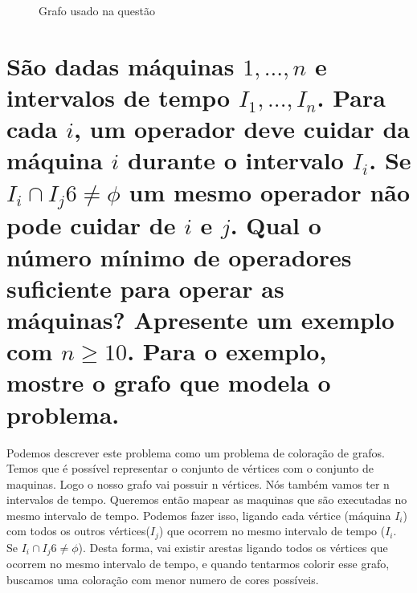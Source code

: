 \documentclass[a4paper,12pt]{article}
\begin{document}
	\begin{figure}[!ht]
		\centering
		\caption{Grafo usado na questão \thesection}
	\end{figure}

\section{São dadas máquinas $1, . . . , n$ e intervalos de tempo $I_1 , . . . , I_n$. Para cada $i$, um operador deve cuidar da máquina $i$ durante o intervalo $I_i$. Se $I_i \cap I_j 6 \neq \phi$ um mesmo operador não pode cuidar de $i$ e $j$. Qual o número mínimo de operadores suficiente para operar as máquinas? Apresente um exemplo com $n \geq 10$. Para o exemplo, mostre o grafo que modela o problema.}
	
	Podemos descrever este problema como um problema de coloração de grafos. Temos que é possível representar o conjunto de vértices com o conjunto de maquinas. Logo o nosso grafo vai possuir n vértices. Nós também vamos ter n intervalos de tempo. Queremos então mapear as maquinas que são executadas no mesmo intervalo de tempo. Podemos fazer isso, ligando cada vértice (máquina $I_i$) com todos os outros vértices($I_j$) que ocorrem no mesmo intervalo de tempo ($I_i$. Se $I_i \cap I_j 6 \neq \phi$). Desta forma, vai existir arestas ligando todos os vértices que ocorrem no mesmo intervalo de tempo, e quando tentarmos colorir esse grafo, buscamos uma coloração com menor numero de cores possíveis.
	
\end{document}
